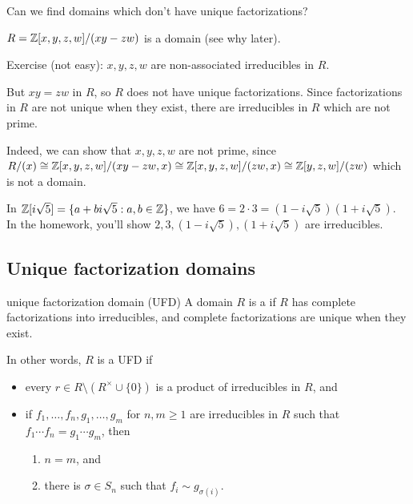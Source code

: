 \documentclass[12pt,letterpaper]{report}
\begin{document}
Can we find domains which don't have unique factorizations?

\begin{ex}
  $R = \mathbb{Z}[x, y, z, w]/(xy - zw)$ is a domain (see why later).

  Exercise (not easy): $x, y, z, w$ are non-associated irreducibles in $R$.

  But $xy = zw$ in $R$, so $R$ does not have unique factorizations.
  Since factorizations in $R$ are not unique when they exist, there are irreducibles in $R$ which
  are not prime.

  Indeed, we can show that $x, y, z, w$ are not prime, since
  $R/(x) \cong \mathbb{Z}[x, y, z, w]/(xy - zw, x) \cong \mathbb{Z}[x, y, z, w]/(zw, x) \cong \mathbb{Z}[y, z, w]/(zw)$
  which is not a domain.
\end{ex}

\begin{ex}
  In $\mathbb{Z}[i\sqrt{5}] = \{a + bi\sqrt{5} : a, b \in \mathbb{Z}\}$, we have
  $6 = 2 \cdot 3 = (1 - i\sqrt{5})(1 + i\sqrt{5})$.
  In the homework, you'll show $2, 3, (1 - i\sqrt{5}), (1 + i\sqrt{5})$ are irreducibles.
\end{ex}

\pagebreak
\subsection{Unique factorization domains}

\begin{defn}{unique factorization domain (UFD)}
  A domain $R$ is a  if $R$ has complete factorizations
  into irreducibles, and complete factorizations are unique when they exist.

  In other words, $R$ is a UFD if
  \begin{itemize}
    \item every $r \in R \setminus (R^\times \cup \{0\})$ is a product of irreducibles in $R$, and
    \item if $f_1, \ldots, f_n, g_1, \ldots, g_m$ for $n, m \geq 1$ are irreducibles in $R$ such
      that $f_1 \cdots f_n = g_1 \cdots g_m$, then
      \begin{enumerate}
        \item $n = m$, and
        \item there is $\sigma \in S_n$ such that $f_i \sim g_{\sigma(i)}$.
      \end{enumerate}
  \end{itemize}
\end{defn}
\end{document}
